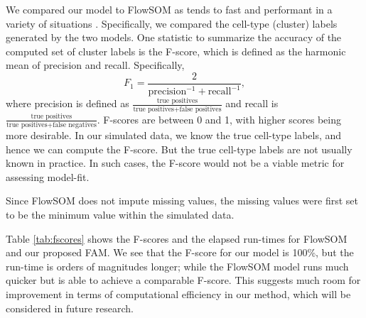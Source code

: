 \documentclass[12pt,]{article}
\newcommand{\true}{{\mbox{\tiny TR}}}
\begin{document}

We compared our model to FlowSOM as tends to fast and performant in a variety
of situations \citep{weber2016comparison}. Specifically, we compared the
cell-type (cluster) labels generated by the two models.
One statistic to summarize the accuracy of the computed set of cluster labels
is the F-score, which is defined as the harmonic mean of precision and recall.
Specifically,
$$
F_1 = \frac{2}{\text{precision}^{-1} + \text{recall}^{-1}},
$$
where precision is defined as $\frac{\text{true positives}}{\text{true
positives} + \text{false positives}}$ and recall is $\frac{\text{true
positives}}{\text{true positives} + \text{false negatives}}$.  F-scores are
between 0 and 1, with higher scores being more desirable. In our simulated
data, we know the true cell-type labels, and hence we can compute the F-score.
But the true cell-type labels are not usually known in practice. In such cases,
the F-score would not be a viable metric for assessing model-fit.

Since FlowSOM does not impute missing values, the missing values were
first set to be the minimum value within the simulated data.

Table \ref{tab:fscores} shows the F-scores and the elapsed run-times for
FlowSOM and our proposed FAM.  We see that the F-score for our model is 100\%,
but the run-time is orders of magnitudes longer; while the FlowSOM model runs
much quicker but is able to achieve a comparable F-score. This suggests much
room for improvement in terms of computational efficiency in our method, which
will be considered in future research.
\end{document}
